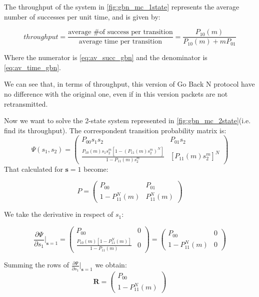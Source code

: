 The throughput of the system in \autoref{fig:gbn_mc_1state} represents the average number of successes per unit time, and is given by:

\begin{equation}\label{eq:thr_1state_gbn}
	throughput = \frac{\text{average \# of success per transition}}{\text{average time per transition}} = \frac{P_{10}(m)}{P_{10}(m) + mP_{01}}
\end{equation}

Where the numerator is \autoref{eq:av_succ_gbn} and the denominator is \autoref{eq:av_time_gbn}.

We can see that, in terms of throughput, this version of Go Back N protocol have no difference with the original one, even if in this version packets are not retransmitted.

Now we want to solve the 2-state system represented in \autoref{fig:gbn_mc_2state}(i.e. find its throughput).
The correspondent transition probability matrix is:
\begin{equation*}
	\Psi(s_1,s_2) =
	\begin{pmatrix}
		P_{00}s_1s_2 & P_{01}s_2 \\
		\frac{P_{10}(m)s_1s_2^m[1-(P_{11}(m)s_2^m)^N]}{1-P_{11}(m)s_2^m} & [P_{11}(m)s_2^m]^N
	\end{pmatrix}
\end{equation*}
That calculated for $\mathbf{s} = 1$ become:

\begin{equation*}
	P =
	\begin{pmatrix}
		P_{00} & P_{01} \\
		1-P_{11}^N(m) & P_{11}^N(m)
	\end{pmatrix}
\end{equation*}

We take the derivative in respect of $s_1$:

\begin{equation*}
	\frac{\partial\Psi}{\partial s_1}\bigg|_{\mathbf{s} = 1} =
	\begin{pmatrix}
		P_{00} & 0\\
		\frac{P_{10}(m)[1-P_{11}^N(m)]}{1-P_{11}(m)} & 0
	\end{pmatrix} =
	\begin{pmatrix}
		P_{00} & 0\\
		1-P_{11}^N(m) & 0
	\end{pmatrix}
\end{equation*}

Summing the rows of $\frac{\partial\Psi}{\partial s_1}\bigg|_{\mathbf{s} = 1}$ we obtain:
\begin{equation}
	\mathbf{R} =
	\begin{pmatrix}
		P_{00} \\
		1-P_{11}^N(m)
	\end{pmatrix}
\end{equation}

